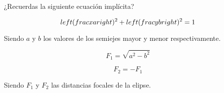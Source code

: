 \documentclass[preview]{standalone}
\begin{document}
\begin{center}
¿Recuerdas la siguiente ecuación implícita?

$$\\left(\\frac{x}{a}\\right)^2+\\left(\\frac{y}{b}\\right)^2=1$$ 

Siendo $a$ y $b$ los valores de los semiejes mayor y menor respectivamente. 

$$F_1=\sqrt{a^2-b^2}$$

$$F_2=-F_1$$

Siendo $F_1$ y $F_2$ las distancias focales de la elipse.
\end{center}
\end{document}
